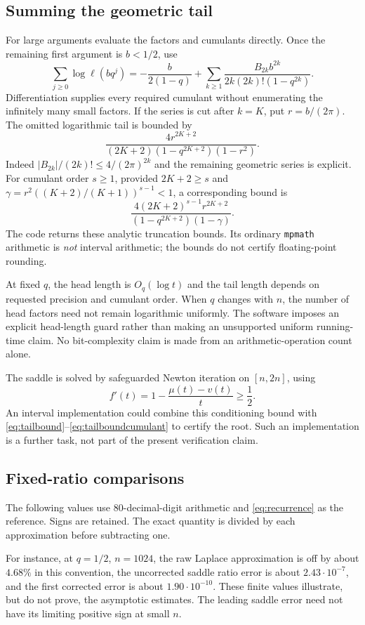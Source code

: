 \documentclass[11pt,a4paper]{article}
\numberwithin{equation}{section}
\theoremstyle{definition}\newtheorem{definition}[theorem]{Definition}
\theoremstyle{remark}\newtheorem{remark}[theorem]{Remark}
\begin{document}
\subsection{Summing the geometric tail}
For large arguments evaluate the factors and cumulants directly. Once the remaining first argument is $b<1/2$, use
\begin{equation}\label{eq:bernoullitail}
 \sum_{j\ge0}\log\ell(bq^j)
 =-\frac{b}{2(1-q)}+
 \sum_{k\ge1}\frac{B_{2k}b^{2k}}{2k(2k)!(1-q^{2k})}.
\end{equation}
Differentiation supplies every required cumulant without enumerating the infinitely many small factors. If the series is cut after $k=K$, put $r=b/(2\pi)$. The omitted logarithmic tail is bounded by
\begin{equation}\label{eq:tailbound}
 \frac{4r^{2K+2}}{(2K+2)(1-q^{2K+2})(1-r^2)}.
\end{equation}
Indeed $|B_{2k}|/(2k)!\le4/(2\pi)^{2k}$ and the remaining geometric series is explicit. For cumulant order $s\ge1$, provided $2K+2\ge s$ and
$\gamma=r^2((K+2)/(K+1))^{s-1}<1$, a corresponding bound is
\begin{equation}\label{eq:tailboundcumulant}
 \frac{4(2K+2)^{s-1}r^{2K+2}}
 {(1-q^{2K+2})(1-\gamma)}.
\end{equation}
The code returns these analytic truncation bounds. Its ordinary \texttt{mpmath} arithmetic is \emph{not} interval arithmetic; the bounds do not certify floating-point rounding.

At fixed $q$, the head length is $O_q(\log t)$ and the tail length depends on requested precision and cumulant order. When $q$ changes with $n$, the number of head factors need not remain logarithmic uniformly. The software imposes an explicit head-length guard rather than making an unsupported uniform running-time claim. No bit-complexity claim is made from an arithmetic-operation count alone.

The saddle is solved by safeguarded Newton iteration on $[n,2n]$, using
\[
 f'(t)=1-\frac{\mu(t)-v(t)}t\ge\frac12.
\]
An interval implementation could combine this conditioning bound with \eqref{eq:tailbound}--\eqref{eq:tailboundcumulant} to certify the root. Such an implementation is a further task, not part of the present verification claim.

\subsection{Fixed-ratio comparisons}
The following values use 80-decimal-digit arithmetic and \eqref{eq:recurrence} as the reference. Signs are retained. The exact quantity is divided by each approximation before subtracting one.
\begin{center}
\small

\end{center}
For instance, at $q=1/2$, $n=1024$, the raw Laplace approximation is off by about $4.68\%$ in this convention, the uncorrected saddle ratio error is about $2.43\cdot10^{-7}$, and the first corrected error is about $1.90\cdot10^{-10}$. These finite values illustrate, but do not prove, the asymptotic estimates. The leading saddle error need not have its limiting positive sign at small $n$.
\end{document}
